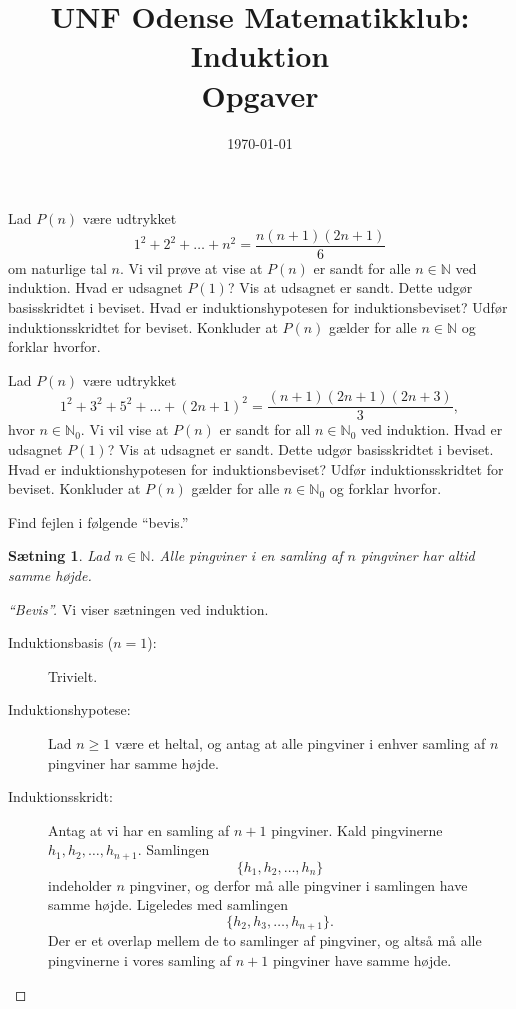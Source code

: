 \documentclass[a4paper,12pt]{article}
\title{UNF Odense Matematikklub: Induktion\\
\Large{Opgaver}}
\author{}
\date{\today}
\theoremstyle{plain}
\newtheorem{saetning}{Sætning}
\newcommand{\N}{\mathbb{N}}
\begin{document}
\maketitle
\thispagestyle{empty}
\newpage
\setcounter{page}{1}
\begin{Exercise}[label={ex:1}]
  Lad \(P(n)\) være udtrykket
  \[
    1^2+2^2+\dots+n^2=\frac{n(n+1)(2n+1)}{6}
    \]
    om naturlige tal \(n\). Vi vil prøve at vise at \(P(n)\) er sandt for alle \(n\in\N\) ved induktion.
    \Question Hvad er udsagnet \(P(1)\)? Vis at udsagnet er sandt. Dette udgør basisskridtet i beviset.
    \Question Hvad er induktionshypotesen for induktionsbeviset?
    \Question Udfør induktionsskridtet for beviset.
    \Question Konkluder at \(P(n)\) gælder for alle \(n\in\N\) og forklar hvorfor.
\end{Exercise}
\begin{Exercise}
 Lad \(P(n)\) være udtrykket
  \[
    1^2+3^2+5^2+\dots+(2n+1)^2=\frac{(n+1)(2n+1)(2n+3)}{3},
    \]
    hvor \(n\in\N_0\). Vi vil vise at \(P(n)\) er sandt for all \(n\in\N_0\) ved induktion.
    \Question Hvad er udsagnet \(P(1)\)? Vis at udsagnet er sandt. Dette udgør basisskridtet i beviset.
    \Question Hvad er induktionshypotesen for induktionsbeviset?
    \Question Udfør induktionsskridtet for beviset.
    \Question Konkluder at \(P(n)\) gælder for alle \(n\in\N_0\) og forklar hvorfor.
\end{Exercise}
\begin{Exercise}
  Find fejlen i følgende ``bevis.''
  \begin{saetning}
    Lad \(n\in\N\). Alle pingviner i en samling af \(n\) pingviner har altid samme højde.
  \end{saetning}
  \begin{proof}[``Bevis'']
    Vi viser sætningen ved induktion.
    \begin{description}
    \item[Induktionsbasis (\(n=1\)):] Trivielt.
    \item[Induktionshypotese:] Lad \(n\ge 1\) være et heltal, og antag at alle pingviner i enhver samling af \(n\) pingviner har samme højde.
    \item[Induktionsskridt:] Antag at vi har en samling af \(n+1\) pingviner. Kald pingvinerne \(h_1,h_2,\dots,h_{n+1}\). Samlingen
      \[
        \{h_1,h_2,\ldots,h_n\}
      \]
        indeholder \(n\) pingviner, og derfor må alle pingviner i samlingen have samme højde. Ligeledes med samlingen
      \[
          \{h_2,h_3,\ldots,h_{n+1}\}.
      \]
      Der er et overlap mellem de to samlinger af pingviner, og altså må alle pingvinerne i vores samling af \(n+1\) pingviner have samme højde.
    \end{description}
  \end{proof}
\end{Exercise}
\end{document}
